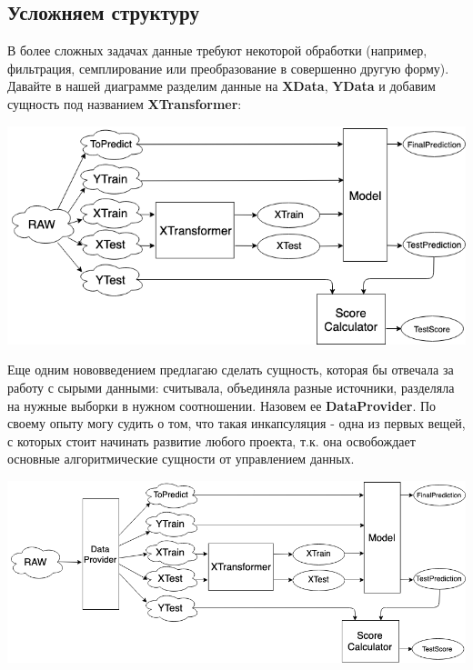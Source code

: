 \subsection{Усложняем структуру}
    
    В более сложных задачах данные требуют некоторой обработки (например, фильтрация, семплирование или преобразование в совершенно другую форму). Давайте в нашей диаграмме разделим данные на \textbf{XData},  \textbf{YData} и добавим сущность под названием \textbf{XTransformer}:
    
    \begin{center} \includegraphics[width=450pt]{images/workflow_schema_3}\end{center}
    
    Еще одним нововведением предлагаю сделать сущность, которая бы отвечала за работу с сырыми данными: считывала, объединяла разные источники, разделяла на нужные выборки в нужном соотношении. Назовем ее \textbf{DataProvider}. По своему опыту могу судить о том, что такая инкапсуляция - одна из первых вещей, с которых стоит начинать развитие любого проекта, т.к. она освобождает основные алгоритмические сущности от управлением данных.
    
    \begin{center} \includegraphics[width=450pt]{images/workflow_schema_4}\end{center}

